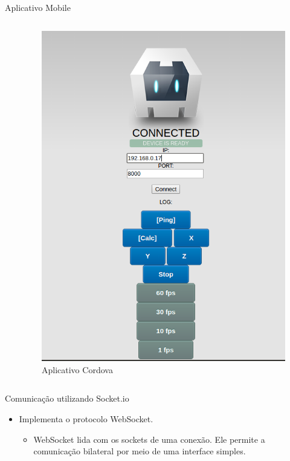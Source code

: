 \documentclass[final,hyperref={pdfpagelabels=false}]{beamer}
\begin{document}
\begin{frame}[t]
\begin{columns}[t]
\begin{column}{.465\textwidth}
\begin{block}{Aplicativo Mobile}
\begin{columns}
\begin{column}{.54\textwidth}
\end{column}

\begin{column}{.43\textwidth} %
\centering
\begin{figure}
\includegraphics[width=0.8\linewidth]{Cordova.png}
\caption{Aplicativo Cordova}
\end{figure}
\end{column}
\end{columns} %


\end{block}


\begin{block}{Comunicação utilizando Socket.io}

\begin{itemize}
\item Implementa o protocolo WebSocket.
\begin{itemize}
\item WebSocket lida com os sockets de uma conexão. Ele permite a comunicação bilateral por meio de uma interface simples.
\end{itemize}


\end{itemize}
\end{block}
\end{column}
\end{columns}
\end{frame}
\end{document}
